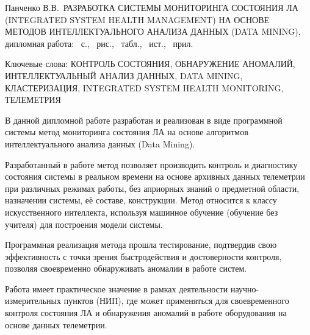 \newcommand{\thesistitle}{Разработка системы мониторинга состояния ЛА (Integrated System Health Management) на основе методов интеллектуального анализа данных (Data Mining)}
\newcommand{\thesisauthor}{Панченко В.В.}
\newcommand{\thesiskeywords}{контроль состояния, обнаружение аномалий, интеллектуальный анализ данных, Data Mining, кластеризация, Integrated System Health Monitoring, телеметрия}

\protect{}
\sloppy
{
\thesisauthor\ \MakeUppercase{\thesistitle}, дипломная работа: \pagecount~с., ~рис., ~табл., ~ист., ~прил.

Ключевые слова: \MakeUppercase{\thesiskeywords}
}
\medskip

В данной дипломной работе разработан и реализован в виде программной системы метод мониторинга состояния ЛА на основе алгоритмов интеллектуального анализа данных (Data Mining).

Разработанный в работе метод позволяет производить контроль и диагностику состояния системы в реальном времени на основе архивных данных телеметрии при различных режимах работы, без априорных знаний о предметной области, назначении системы, её составе, конструкции. Метод относится к классу искусственного интеллекта, используя машинное обучение (обучение без учителя) для построения модели системы.

Программная реализация метода прошла тестирование, подтвердив свою эффективность с точки зрения быстродействия и достоверности контроля, позволяя своевременно обнаруживать аномалии в работе систем.

Работа имеет практическое значение в рамках деятельности научно-измерительных пунктов (НИП), где может применяться для своевременного контроля состояния ЛА и обнаружения аномалий в работе оборудования на основе данных телеметрии.